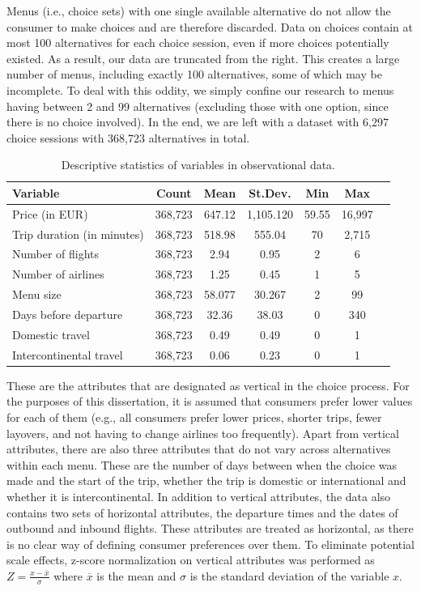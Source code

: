 \documentclass[a4paper,12pt]{article}
\begin{document}
Menus (i.e., choice sets) with one single available alternative do not allow the consumer to make choices and are therefore discarded. Data on choices contain at most 100 alternatives for each choice session, even if more choices potentially existed. As a result, our data are truncated from the right. This creates a large number of menus, including exactly 100 alternatives, some of which may be incomplete. To deal with this oddity, we simply confine our research to menus having between 2 and 99 alternatives (excluding those with one option, since there is no choice involved).  In the end, we are left with a dataset with  6,297 choice sessions with 368,723 alternatives in total.


\begin{table}
    \centering
    
    \begin{tabular}{l|cccccc}
    \hline
    Variable & Count & Mean & St.Dev. & Min & Max \\
    \hline
    Price (in EUR) & 368,723 & 647.12 & 1,105.120 & 59.55 & 16,997 \\
    Trip duration (in minutes) & 368,723 & 518.98 & 555.04 & 70 & 2,715 \\
    Number of flights & 368,723 & 2.94 & 0.95 & 2 & 6 \\
    Number of airlines & 368,723 & 1.25 & 0.45 & 1 & 5 \\
    Menu size & 368,723 & 58.077 & 30.267 & 2 & 99 \\
    Days before departure & 368,723 & 32.36 & 38.03 & 0 & 340\\
    Domestic travel & 368,723 & 0.49 & 0.49 & 0 & 1\\
    Intercontinental travel & 368,723 & 0.06 & 0.23 & 0 & 1\\
    \hline
    \end{tabular}
    \caption{Descriptive statistics of variables in observational data.}
    \label{tab:descriptiveStats}
\end{table}

These are the attributes that are designated as vertical in the choice process. For the purposes of this dissertation, it is assumed that consumers prefer lower values for each of them (e.g., all consumers prefer lower prices, shorter trips, fewer layovers, and not having to change airlines too frequently). Apart from vertical attributes, there are also three attributes that do not vary across alternatives within each menu. These are the number of days between when the choice was made and the start of the trip, whether the trip is
domestic or international and whether it is intercontinental. In addition to vertical attributes, the data also contains two sets of horizontal attributes, the departure times and the dates of outbound and inbound flights. These attributes are treated as horizontal, as there is no clear way of defining consumer preferences over them. To eliminate potential scale effects, z-score normalization on vertical attributes was performed as $Z = \frac{{x - \overline{x}}}{{\sigma}}
$ where $\overline{x}$ is the mean and $\sigma$ is the standard deviation of the variable $x$. 
\end{document}
